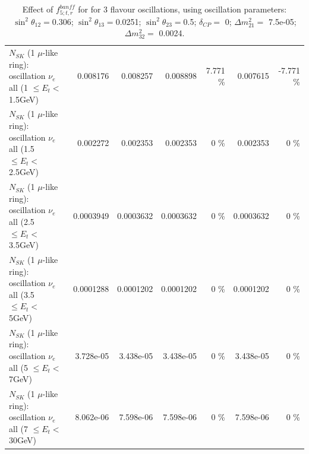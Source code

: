 \begin{table}
\begin{tabular}{| l | r | r | r  r | r  r |}
$N_{SK}$ (1 $\mu$-like ring): oscillation $\nu_{e}$ all (1 $\leq E_{t} <$ 1.5GeV) &        0.008176 &        0.008257 &        0.008898 &    7.771 \%  &        0.007615 &   -7.771 \%  \\ 
$N_{SK}$ (1 $\mu$-like ring): oscillation $\nu_{e}$ all (1.5 $\leq E_{t} <$ 2.5GeV) &        0.002272 &        0.002353 &        0.002353 &        0 \%  &        0.002353 &        0 \%  \\ 
$N_{SK}$ (1 $\mu$-like ring): oscillation $\nu_{e}$ all (2.5 $\leq E_{t} <$ 3.5GeV) &       0.0003949 &       0.0003632 &       0.0003632 &        0 \%  &       0.0003632 &        0 \%  \\ 
$N_{SK}$ (1 $\mu$-like ring): oscillation $\nu_{e}$ all (3.5 $\leq E_{t} <$ 5GeV) &       0.0001288 &       0.0001202 &       0.0001202 &        0 \%  &       0.0001202 &        0 \%  \\ 
 $N_{SK}$ (1 $\mu$-like ring): oscillation $\nu_{e}$ all (5 $\leq E_{t} <$ 7GeV) &       3.728e-05 &       3.438e-05 &       3.438e-05 &        0 \%  &       3.438e-05 &        0 \%  \\ 
$N_{SK}$ (1 $\mu$-like ring): oscillation $\nu_{e}$ all (7 $\leq E_{t} <$ 30GeV) &       8.062e-06 &       7.598e-06 &       7.598e-06 &        0 \%  &       7.598e-06 &        0 \%  \\ 
\hline
\hline
\end{tabular}
\caption{ Effect of $f_{5; t, r}^{banff}$ for for 3 flavour oscillations, using oscillation parameters:  $\sin^2\theta_{12} = $0.306; $\sin^2\theta_{13} = $0.0251; $\sin^2\theta_{23} = $0.5; $\delta_{CP} = $        0; $\Delta m^2_{21} = $    7.5e-05; $\Delta m^2_{32} = $    0.0024. }
\label{tab:num_banff_05_1RmuT_3f_osc_t13:0.0251}
\end{table}
\clearpage
